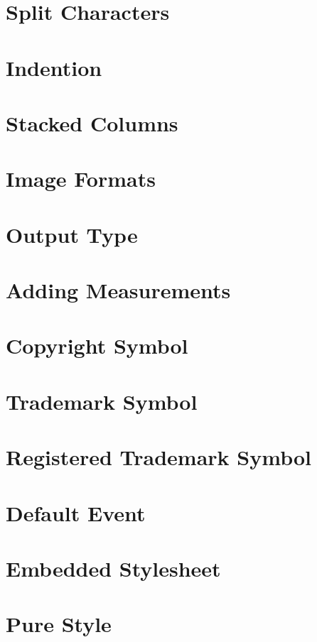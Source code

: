 \documentclass{book}
\begin{document}
\section{Split Characters}

\section{Indention}

\section{Stacked Columns}

\section{Image Formats}

\section{Output Type}

\section{Adding Measurements}

\section{Copyright Symbol}

\section{Trademark Symbol}

\section{Registered Trademark Symbol}

\section{Default Event}

\section{Embedded Stylesheet}

\section{Pure Style}
\end{document}
